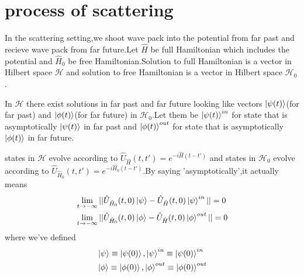 \documentclass[a4paper]{article}
\begin{document}
\section{process of scattering}
In the scattering setting,we shoot wave pack into the potential from far past and recieve wave pack from far future.Let $\hat{H}$ be full Hamiltonian which includes the potential and $\hat{H}_0$ be free Hamiltonian.Solution to full Hamiltonian is a vector in Hilbert space $\mathscr{H}$ and solution to free Hamiltonian is a vector in Hilbert space $\mathscr{H}_0$.
\par In $\mathscr{H}$ there exist solutions in far past and far future looking like vectors $\ket{\psi(t)}$(for far past) and $\ket{\phi(t)}$(for far future) in $\mathscr{H}_0$.Let them be $\ket{\psi(t)}^{in}$ for state that is asymptotically  $\ket{\psi(t)}$ in far past and $\ket{\phi(t)}^{out}$ for state that is asymptotically $\ket{\phi(t)}$ in far future.
\par states in $\mathscr{H}$ evolve according to $\hat{U}_{\hat{H}}(t,t')=e^{-i\hat{H}(t-t')}$ and states in $\mathscr{H}_0$ evolve according to $\hat{U}_{\hat{H}_0}(t,t')=e^{-i\hat{H}_0(t-t')}$.By saying 'asymptotically',it actually means
\begin{align*}
	&\lim_{t\rightarrow -\infty}||\hat{U}_{\hat{H}_0}(t,0)\ket{\psi}-\hat{U}_{\hat{H}}(t,0)\ket{\psi}^{in}||=0\\&\lim_{t\rightarrow -\infty}||\hat{U}_{\hat{H}_0}(t,0)\ket{\phi}-\hat{U}_{\hat{H}}(t,0)\ket{\phi}^{out}||=0
\end{align*}
where we've defined
\begin{align*}
	&\ket{\psi}\equiv\ket{\psi(0)},\ket{\psi}^{in}\equiv\ket{\psi(0)}^{in}\\&\ket{\phi}\equiv\ket{\phi(0)},\ket{\phi}^{out}\equiv\ket{\phi(0)}^{out}
\end{align*}
\end{document}
